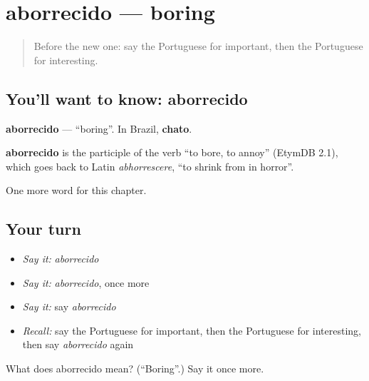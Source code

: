 \section[aborrecido]{aborrecido — boring}

\label{lesson:PT-C123-aborrecido}



\begin{quote}
Before the new one: say the Portuguese for important, then the Portuguese for interesting.
\end{quote}

\subsection*{You'll want to know: aborrecido}
\textbf{aborrecido} — \textquotedblleft{}boring\textquotedblright{}. In Brazil, \textbf{chato}.

\begin{cousinweb}
\textbf{aborrecido} is the participle of the verb \textquotedblleft{}to bore, to annoy\textquotedblright{} (EtymDB 2.1), which goes back to Latin \emph{abhorrescere}, \textquotedblleft{}to shrink from in horror\textquotedblright{}.
\end{cousinweb}

\begin{grammarlens}[title={What you've built}]
One more word for this chapter.
\end{grammarlens}

\subsection*{Your turn}
\begin{itemize}
\raggedright
  \item \emph{Say it:} \emph{aborrecido}
  \item \emph{Say it:} \emph{aborrecido}, once more
  \item \emph{Say it:} say \emph{aborrecido}
  \item \emph{Recall:} say the Portuguese for important, then the Portuguese for interesting, then say \emph{aborrecido} again
\end{itemize}

\begin{tcolorbox}[breakable,colback=teal!4,colframe=teal!35!black,title={Before you move on}]
What does aborrecido mean? (\textquotedblleft{}Boring\textquotedblright{}.) Say it once more.
\end{tcolorbox}

